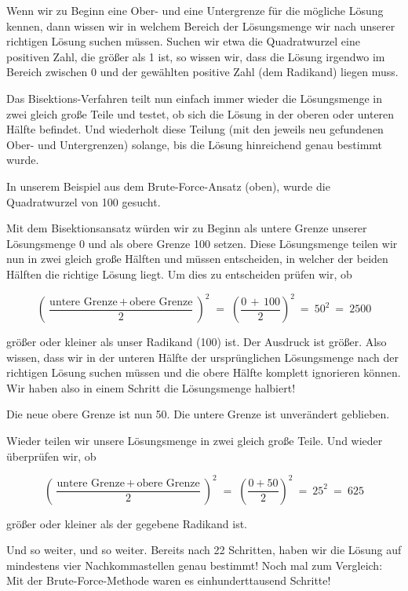 Wenn wir zu Beginn eine Ober- und eine Untergrenze für die mögliche Lösung
kennen, dann wissen wir in welchem Bereich der Lösungsmenge wir nach unserer
richtigen Lösung suchen müssen. Suchen wir etwa die Quadratwurzel eine positiven
Zahl, die größer als 1 ist, so wissen wir, dass die Lösung irgendwo im
Bereich zwischen 0 und der gewählten positive Zahl (dem Radikand) liegen muss.

Das Bisektions-Verfahren teilt nun einfach immer wieder die Lösungsmenge in zwei
gleich große Teile und testet, ob sich die Lösung in der oberen oder unteren
Hälfte befindet. Und wiederholt diese Teilung (mit den jeweils neu gefundenen
Ober- und Untergrenzen) solange, bis die Lösung hinreichend genau bestimmt
wurde.

In unserem Beispiel aus dem Brute-Force-Ansatz (oben), wurde die Quadratwurzel
von 100 gesucht.

Mit dem Bisektionsansatz würden wir zu Beginn als untere Grenze unserer
Lösungsmenge 0 und als obere Grenze 100 setzen. Diese Lösungsmenge teilen wir
nun in zwei gleich große Hälften und müssen entscheiden, in welcher der beiden
Hälften die richtige Lösung liegt. Um dies zu entscheiden prüfen wir, ob

$$
\left(\frac{\textrm{untere Grenze} \,+\, \textrm{obere Grenze}}{2}\right)^2 \; =
\; \left(\frac{0 \,+\, 100}{2}\right)^2 ~=~ 50^2 ~=~ 2500
$$

größer oder kleiner als unser Radikand (100) ist. Der Ausdruck ist größer. Also
wissen, dass wir in der unteren Hälfte der ursprünglichen Lösungsmenge nach der
richtigen Lösung suchen müssen und die obere Hälfte komplett ignorieren können.
Wir haben also in einem Schritt die Lösungsmenge halbiert!

Die neue obere Grenze ist nun 50. Die untere Grenze ist unverändert geblieben.

Wieder teilen wir unsere Lösungsmenge in zwei gleich große Teile. Und wieder
überprüfen wir, ob

$$
\left(\frac{\textrm{untere Grenze} \,+\, \textrm{obere Grenze}}{2}\right)^2 \; =
\; \left(\frac{0 + 50}{2}\right)^2 ~=~ 25^2 ~=~ 625
$$

größer oder kleiner als der gegebene Radikand ist.

Und so weiter, und so weiter. Bereits nach 22 Schritten, haben wir die Lösung
auf mindestens vier Nachkommastellen genau bestimmt! Noch mal zum Vergleich: Mit
der Brute-Force-Methode waren es einhunderttausend Schritte!

\pagebreak

